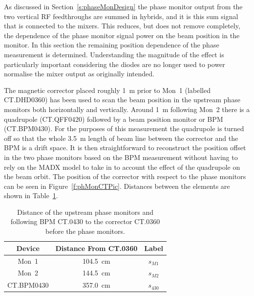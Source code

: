 
As discussed in Section~\ref{s:phaseMonDesign} the phase monitor output from the two vertical RF feedthroughs are summed in hybrids, and it is this sum signal that is connected to the mixers. This reduces, but does not remove completely, the dependence of the phase monitor signal power on the beam position in the monitor. In this section the remaining position dependence of the phase measurement is determined. Understanding the magnitude of the effect is particularly important considering the diodes are no longer used to power normalise the mixer output as originally intended.

The magnetic corrector placed roughly 1~m prior to Mon~1 (labelled CT.DHD0360) has been used to scan the beam position in the upstream phase monitors both horizontally and vertically. Around 1~m following Mon~2 there is a quadrupole (CT.QFF0420) followed by a beam position monitor or BPM (CT.BPM0430). For the purposes of this measurement the quadrupole is turned off so that the whole 3.5~m length of beam line between the corrector and the BPM is a drift space. It is then straightforward to reconstruct the position offset in the two phase monitors based on the BPM measurement without having to rely on the MADX model to take in to account the effect of the quadrupole on the beam orbit. The position of the corrector with respect to the phase monitors can be seen in Figure~\ref{f:phMonCTPic}. Distances between the elements are shown in Table~\ref{t:distanceFromCT360}.


\begin{table}
  \begin{center}
    \begin{tabular}{|c c c|}
	   \hline
       Device & Distance From CT.0360 & Label\\ \hline
       Mon~1 & 104.5~cm & \(s_{M1}\)\\ 
       Mon~2 & 144.5~cm & \(s_{M2}\)\\
       CT.BPM0430 & 357.0~cm & \(s_{430}\) \\ \hline
    \end{tabular}
    \caption{Distance of the upstream phase monitors and following BPM CT.0430 to the corrector CT.0360 before the phase monitors.}
  	\label{t:distanceFromCT360}
  \end{center}
\end{table}

